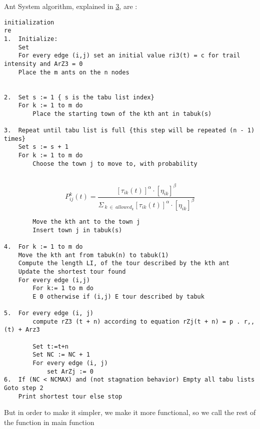 \documentclass[11pt]{article}
\begin{document}
Ant System algorithm, explained in
\href{https://ieeexplore.ieee.org/document/484436}{3}, are :

\begin{verbatim}
initialization
re
1.  Initialize: 
    Set 
    For every edge (i,j) set an initial value ri3(t) = c for trail intensity and ArZ3 = 0 
    Place the m ants on the n nodes  


2.  Set s := 1 { s is the tabu list index} 
    For k := 1 to m do 
        Place the starting town of the kth ant in tabuk(s) 
        
3.  Repeat until tabu list is full {this step will be repeated (n - 1) times} 
    Set s := s + 1 
    For k := 1 to m do
        Choose the town j to move to, with probability 
        
\end{verbatim}

\[ P_{ij}^k(t) = \frac{[\tau_{ik}(t)]^{\alpha} \cdot [\eta_{ik}]^{\beta}}  
{\Sigma_{\ k\  \in\ allowed_k} [\tau_{ik}(t)]^{\alpha} \cdot [\eta_{ik}]^{\beta} } \]

\begin{verbatim}
        Move the kth ant to the town j 
        Insert town j in tabuk(s) 
        
4.  For k := 1 to m do 
    Move the kth ant from tabuk(n) to tabuk(1) 
    Compute the length LI, of the tour described by the kth ant 
    Update the shortest tour found 
    For every edge (i,j) 
        For k:= 1 to m do 
        E 0 otherwise if (i,j) E tour described by tabuk 
        
5.  For every edge (i, j) 
        compute rZ3 (t + n) according to equation rZj(t + n) = p . r,,(t) + Arz3 
        
        Set t:=t+n 
        Set NC := NC + 1 
        For every edge (i, j) 
            set ArZj := 0 
6.  If (NC < NCMAX) and (not stagnation behavior) Empty all tabu lists Goto step 2 
    Print shortest tour else stop
\end{verbatim}

But in order to make it simpler, we make it more functional, so we call
the rest of the function in main function
\end{document}
